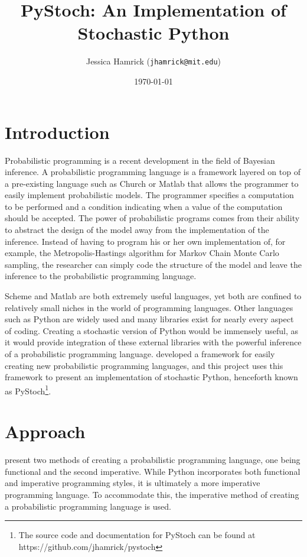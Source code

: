 \documentclass[12pt,letterpaper]{article}
\title{PyStoch: An Implementation of Stochastic Python}
\author{Jessica Hamrick (\texttt{jhamrick@mit.edu})}
\date{\today{}}
\begin{document}
\newcommand{\TODO}[1]{[TODO: #1]}

\maketitle
\doublespacing

\section{Introduction}
\label{sec:introduction}

Probabilistic programming is a recent development in the field of
Bayesian inference.  A probabilistic programming language is a
framework layered on top of a pre-existing language such as Church
\cite{Goodman2008} or Matlab \cite{Wingate2011} that allows the
programmer to easily implement probabilistic models.  The programmer
specifies a computation to be performed and a condition indicating
when a value of the computation should be accepted.  The power of
probabilistic programs comes from their ability to abstract the design
of the model away from the implementation of the inference.  Instead
of having to program his or her own implementation of, for example,
the Metropolis-Hastings algorithm for Markov Chain Monte Carlo
sampling, the researcher can simply code the structure of the model
and leave the inference to the probabilistic programming language.

Scheme and Matlab are both extremely useful languages, yet both are
confined to relatively small niches in the world of programming
languages.  Other languages such as Python are widely used and many
libraries exist for nearly every aspect of coding.  Creating a
stochastic version of Python would be immensely useful, as it would
provide integration of these external libraries with the powerful
inference of a probabilistic programming language.  
developed a framework for easily creating new probabilistic
programming languages, and this project uses this framework to present
an implementation of stochastic Python, henceforth known as
PyStoch\footnote{The source code and documentation for PyStoch can be
  found at https://github.com/jhamrick/pystoch}.

\section{Approach}

 present two methods of creating a probabilistic
programming language, one being functional and the second imperative.
While Python incorporates both functional and imperative programming
styles, it is ultimately a more imperative programming language.  To
accommodate this, the imperative method of creating a probabilistic
programming language is used.
\end{document}
